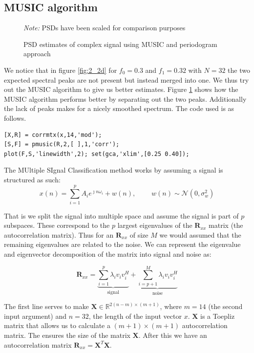 \documentclass[10pt,twoside,a4paper]{report}
\begin{document}
\subsection{MUSIC algorithm}
\begin{figure}[h!]
\centering
\resizebox{\textwidth}{!}{}
\textit{Note:} PSDs have been scaled for comparison purposes
\caption{PSD estimates of complex signal using MUSIC and periodogram approach}
\label{fig:2_2e}
\end{figure}
We notice that in figure \ref{fig:2_2d} for $f_0 = 0.3$ and $f_1 = 0.32$ with $N=32$ the two expected spectral peaks are not present but instead merged into one. We thus try out the MUSIC algorithm to give us better estimates. Figure \ref{fig:2_2e} shows how the MUSIC algorithm performs better by separating out the two peaks. Additionally the lack of peaks makes for a nicely smoothed spectrum. The code used is as follows.
\begin{lstlisting}
[X,R] = corrmtx(x,14,'mod');
[S,F] = pmusic(R,2,[ ],1,'corr');
plot(F,S,'linewidth',2); set(gca,'xlim',[0.25 0.40]);
\end{lstlisting}

The MUltiple SIgnal Classiﬁcation method works by assuming a signal is structured as such:
\begin{equation}
x(n) = \sum_{i=1}^{p} A_i e^{\jmath n \omega_i} + w(n), \; \qquad w(n) \sim \mathcal{N}(0,\sigma_w^2)
\end{equation}


That is we split the signal into multiple space and assume the signal is part of $ p $ subspaces. These correspond to the $ p $ largest eigenvalues of the $ \mathbf{R}_{xx} $ matrix (the autocorrelation matrix). Thus for an $ \mathbf{R}_{xx} $ of size $ M $ we would assumed that the remaining eigenvalues are related to the noise. We can represent the eigenvalue and eigenvector decomposition of the matrix into signal and noise as:

\begin{equation}
\mathbf{R}_{xx} = \underbrace{ \sum_{i=1}^{p} \lambda_i v_i v_i^H}_\text{signal} + \underbrace{\sum_{i=p+1}^{M} \lambda_i v_i v_i^H}_\text{noise}
\end{equation}






The first line  serves to make $ \mathbf{X} \in \mathbb{R}^{2(n-m) \times (m+1)} $, where $m=14$ (the second input argument) and $n=32$, the length of the input vector $x$. $\mathbf{X}$ is a Toepliz matrix that allows us to calculate a $(m+1)\times (m+1)$ autocorrelation matrix. The  ensures the size of the matrix $\mathbf{X}$. After this we have an autocorrelation matrix $\mathbf{R}_{xx} = \mathbf{X}^T \mathbf{X}$.
\end{document}
